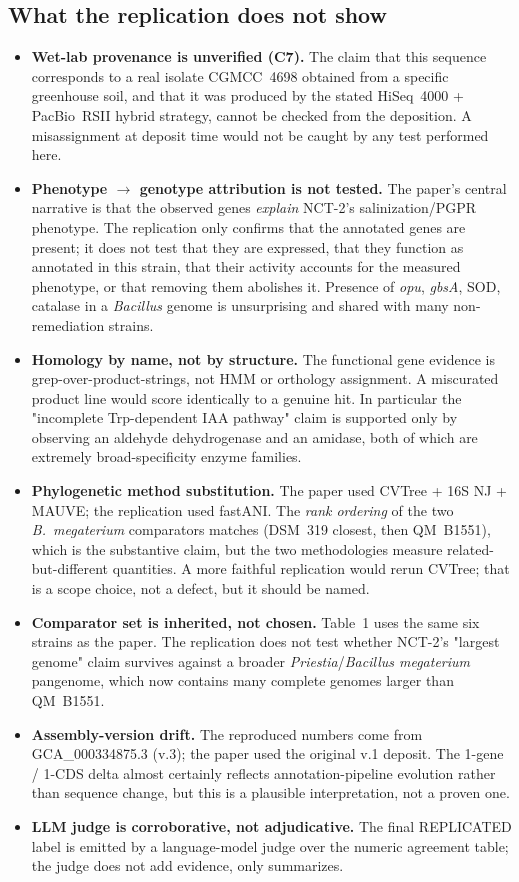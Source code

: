 \documentclass[11pt]{article}
\begin{document}
\subsection*{What the replication does \textbf{not} show}
\begin{itemize}
\item \textbf{Wet-lab provenance is unverified (C7).} The claim that this sequence corresponds to a real isolate CGMCC~4698 obtained from a specific greenhouse soil, and that it was produced by the stated HiSeq~4000 + PacBio~RSII hybrid strategy, cannot be checked from the deposition. A misassignment at deposit time would not be caught by any test performed here.
\item \textbf{Phenotype $\rightarrow$ genotype attribution is not tested.} The paper's central narrative is that the observed genes \emph{explain} NCT-2's salinization/PGPR phenotype. The replication only confirms that the annotated genes are present; it does not test that they are expressed, that they function as annotated in this strain, that their activity accounts for the measured phenotype, or that removing them abolishes it. Presence of \emph{opu}, \emph{gbsA}, SOD, catalase in a \emph{Bacillus} genome is unsurprising and shared with many non-remediation strains.
\item \textbf{Homology by name, not by structure.} The functional gene evidence is grep-over-product-strings, not HMM or orthology assignment. A miscurated product line would score identically to a genuine hit. In particular the "incomplete Trp-dependent IAA pathway" claim is supported only by observing an aldehyde dehydrogenase and an amidase, both of which are extremely broad-specificity enzyme families.
\item \textbf{Phylogenetic method substitution.} The paper used CVTree + 16S NJ + MAUVE; the replication used fastANI. The \emph{rank ordering} of the two \emph{B.~megaterium} comparators matches (DSM~319 closest, then QM~B1551), which is the substantive claim, but the two methodologies measure related-but-different quantities. A more faithful replication would rerun CVTree; that is a scope choice, not a defect, but it should be named.
\item \textbf{Comparator set is inherited, not chosen.} Table~1 uses the same six strains as the paper. The replication does not test whether NCT-2's "largest genome" claim survives against a broader \emph{Priestia}/\emph{Bacillus megaterium} pangenome, which now contains many complete genomes larger than QM~B1551.
\item \textbf{Assembly-version drift.} The reproduced numbers come from GCA\_000334875.3 (v.3); the paper used the original v.1 deposit. The 1-gene / 1-CDS delta almost certainly reflects annotation-pipeline evolution rather than sequence change, but this is a plausible interpretation, not a proven one.
\item \textbf{LLM judge is corroborative, not adjudicative.} The final REPLICATED label is emitted by a language-model judge over the numeric agreement table; the judge does not add evidence, only summarizes.
\end{itemize}
\end{document}
